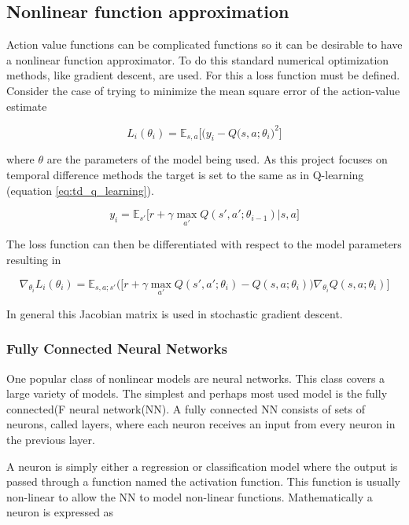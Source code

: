 \subsection{Nonlinear function approximation}

Action value functions can be complicated functions so it can be desirable to have a nonlinear function approximator. To do this standard numerical optimization methods, like gradient descent, are used. For this a loss function must be defined. Consider the case of trying to minimize the mean square error of the action-value estimate

\begin{equation}
    L_i(\theta_i) = \mathbb{E}_{s,a}\Big[\big(y_i - Q(s,a;\theta_i\big)^2\Big]
\end{equation}

where $\theta$ are the parameters of the model being used. As this project focuses on temporal difference methods the target is set to the same as in Q-learning (equation \ref{eq:td_q_learning}).

\begin{equation}
    y_i = \mathbb{E}_{s'}\big[r+\gamma \max_{a'} Q(s', a'; \theta_{i-1})|s,a\big]
    \label{eq:Q_target}
\end{equation}

The loss function can then be differentiated with respect to the model parameters resulting in 

\begin{equation}
    \label{eq:RL_gradient_descent}
    \nabla_{\theta_i}L_i(\theta_i) = \mathbb{E}_{s,a; s'}\Big(\Big[r+\gamma\max_{a'}Q(s',a';\theta_i)-Q(s,a;\theta_i)\Big)\nabla_{\theta_i}Q(s,a;\theta_i)\Big]
\end{equation}

In general this Jacobian matrix is used in stochastic gradient descent.

\subsubsection{Fully Connected Neural Networks}

One popular class of nonlinear models are neural networks. This class covers a large variety of models. The simplest and perhaps most used model is the fully connected(F neural network(NN). A fully connected NN consists of sets of neurons, called layers, where each neuron receives an input from every neuron in the previous layer.

A neuron is simply either a regression or classification model where the output is passed through a function named the activation function. This function is usually non-linear to allow the NN to model non-linear functions. Mathematically a neuron is expressed as 

